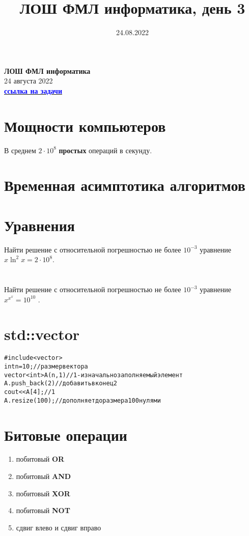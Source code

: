 \documentclass[10pt]{article}
\title{ЛОШ ФМЛ информатика, день 3}
\date{24.08.2022}
\begin{document}
\begin{center}
    \Large
    \textbf{ЛОШ ФМЛ информатика}
    \vspace{0.4cm}
    \large
    \\
    24 августа 2022
    \\
    \huge
    \href{https://codeforces.com/contestInvitation/d774eea092a06d1bcd781cdd4e4d8ce56585f13f}{\textcolor{blue}{\bf ссылка на задачи}}
\end{center}

    \section{Мощности компьютеров}
    В среднем $2 \cdot 10^8$ \textbf{простых} операций в секунду.
    
    \section{Временная асимптотика алгоритмов}
 
   
    \section{Уравнения}
    Найти решение с относительной погрешностью не более $10^{-3}$ уравнение $x \ln^2 x = 2 \cdot 10^8$.
    \\
    \\
    \\
    Найти решение с относительной погрешностью не более $10^{-3}$ уравнение  \Large $x ^ {x ^ x} = 10^{10}$ \normalsize.
    \\
    \section{std::vector}
    \begin{alltt}
#include<vector>
int n = 10; // размер вектора
vector<int> A(n , 1) // 1 - изначально заполняемый элемент
A.push_back(2) // добавить в конец 2
cout << A[4]; // 1
A.resize(100); // дополняет до размера 100 нулями 
    \end{alltt}
    \section{Битовые операции}
        \begin{enumerate} 
            \item побитовый \textbf{OR} 
            \item  побитовый \textbf{AND} 
            \item  побитовый \textbf{XOR}
            \item  побитовый \textbf{NOT}
            \item  сдвиг влево и сдвиг вправо
        \end{enumerate}
\end{document}
